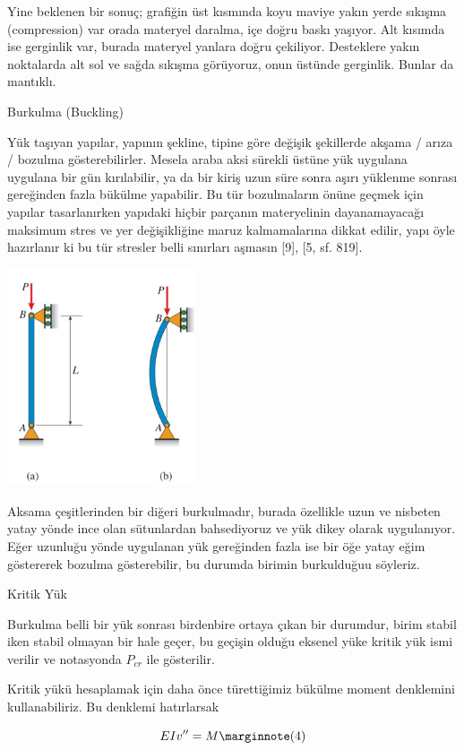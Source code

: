 \documentclass[12pt,fleqn]{article}\usepackage{../../common}
\begin{document}
Yine beklenen bir sonuç; grafiğin üst kısmında koyu maviye yakın yerde sıkışma
(compression) var orada materyel daralma, içe doğru baskı yaşıyor. Alt kısımda
ise gerginlik var, burada materyel yanlara doğru çekiliyor. Desteklere yakın
noktalarda alt sol ve sağda sıkışma görüyoruz, onun üstünde gerginlik.  Bunlar
da mantıklı.

Burkulma (Buckling)

Yük taşıyan yapılar, yapının şekline, tipine göre değişik şekillerde akşama /
arıza / bozulma gösterebilirler. Mesela araba aksi sürekli üstüne yük uygulana
uygulana bir gün kırılabilir, ya da bir kiriş uzun süre sonra aşırı yüklenme
sonrası gereğinden fazla bükülme yapabilir. Bu tür bozulmaların önüne geçmek
için yapılar tasarlanırken yapıdaki hiçbir parçanın materyelinin dayanamayacağı
maksimum stres ve yer değişikliğine maruz kalmamalarına dikkat edilir, yapı öyle
hazırlanır ki bu tür stresler belli sınırları aşmasın [9], [5, sf. 819].

\includegraphics[width=15em]{phy_020_strs_06_02.jpg}

Aksama çeşitlerinden bir diğeri burkulmadır, burada özellikle uzun ve nisbeten
yatay yönde ince olan sütunlardan bahsediyoruz ve yük dikey olarak uygulanıyor.
Eğer uzunluğu yönde uygulanan yük gereğinden fazla ise bir öğe yatay eğim
göstererek bozulma gösterebilir, bu durumda birimin burkulduğuu söyleriz.

Kritik Yük

Burkulma belli bir yük sonrası birdenbire ortaya çıkan bir durumdur, birim
stabil iken stabil olmayan bir hale geçer, bu geçişin olduğu eksenel yüke
kritik yük ismi verilir ve notasyonda $P_{cr}$ ile gösterilir.

Kritik yükü hesaplamak için daha önce türettiğimiz bükülme moment denklemini
kullanabiliriz. Bu denklemi hatırlarsak

$$
EI v'' = M
\mlabel{4}
$$
\end{document}
